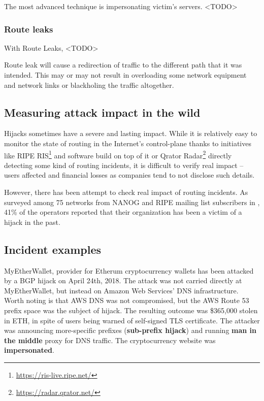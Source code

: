 The most advanced technique is impersonating victim's servers. <TODO>


\subsubsection{Route leaks}
With Route Leaks, <TODO>

Route leak will cause a redirection of traffic to the different path that it was intended. This may or may not result in overloading some network equipment and network links or blackholing the traffic altogether. 

\subsection{Measuring attack impact in the wild}
\label{def:measurement}
Hijacks sometimes have a severe and lasting impact. While it is relatively easy to monitor the state of routing in the Internet's control-plane thanks to initiatives like RIPE RIS\footnote{\url{https://ris-live.ripe.net/}} and software build on top of it or Qrator Radar\footnote{\url{https://radar.qrator.net/}} directly detecting some kind of routing incidents, it is difficult to verify real impact -- users affected and financial losses as companies tend to not disclose such details. 

However, there has been attempt to check real impact of routing incidents. As surveyed among 75 networks from NANOG and RIPE mailing list subscribers in \cite{Sermpezis2018}, 41\% of the operators reported that their organization has been a victim of a hijack in the past. 





\subsection{Incident examples}

MyEtherWallet, provider for Etherum cryptocurrency wallets has been attacked by a BGP hijack on April 24th, 2018\cite{Brandom2018}. The attack was not carried directly at MyEtherWallet, but instead on Amazon Web Services' DNS infrastructure. Worth noting is that AWS DNS was not compromised, but the AWS Route 53 prefix space was the subject of hijack. The resulting outcome was \$365,000 stolen in ETH, in spite of users being warned of self-signed TLS certificate. The attacker was announcing more-specific prefixes (\textbf{sub-prefix hijack}) and running \textbf{man in the middle} proxy for DNS traffic. The cryptocurrency website was \textbf{impersonated}.

